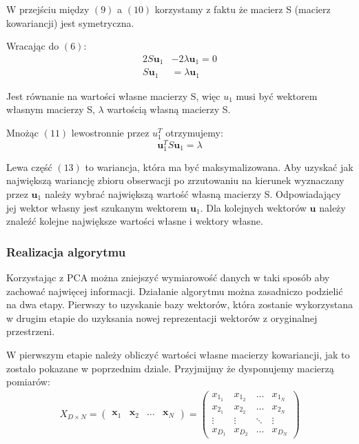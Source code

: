 \documentclass{article}
\newcommand{\bb}{\textbf}
\begin{document}
W przejściu między $(9)$ a $(10)$ korzystamy z faktu że macierz S (macierz kowariancji) jest symetryczna.

Wracając do $(6)$:
\begin{align}
	2 S \bb{u}_1 &- 2 \lambda \bb{u}_1 = 0	\nonumber \\
	S \bb{u}_1 &= \lambda \bb{u}_1 
\end{align}

Jest równanie na wartości własne macierzy S, więc $u_1$ musi być wektorem własnym macierzy S, $\lambda$ wartością własną macierzy S.

Mnożąc $(11)$ lewostronnie przez $u_1^T$ otrzymujemy:
\begin{equation}
	\bb{u}_1^T S \bb{u}_1 = \lambda
\end{equation}

Lewa część $(13)$ to wariancja, która ma być maksymalizowana. Aby uzyskać jak największą wariancję zbioru obserwacji po zrzutowaniu na kierunek wyznaczany przez $\bb{u}_1$ należy wybrać największą wartość własną macierzy S. Odpowiadający jej wektor własny jest szukanym wektorem $\bb{u}_1$. Dla kolejnych wektorów $\bb{u}$ należy znaleźć kolejne największe wartości własne i wektory własne.

\subsubsection{Realizacja algorytmu} 
Korzystając z PCA można zniejszyć wymiarowość danych w taki sposób aby zachować najwięcej informacji. Działanie algorytmu można zasadniczo podzielić na dwa etapy. Pierwszy to uzyskanie bazy wektorów, która zostanie wykorzystana w drugim etapie do uzyksania nowej reprezentacji wektorów z oryginalnej przestrzeni.

W pierwszym etapie należy obliczyć wartości własne macierzy kowariancji, jak to zostało pokazane w poprzednim dziale. Przyjmijmy że dysponujemy macierzą pomiarów:
\begin{align}
	X_{D \times N} = 
	\left( \begin{array}{llll}
		\bb{x}_1 & \bb{x}_2 & \ldots & \bb{x}_N
	\end{array} \right)	
	=
	\left( \begin{array}{llll}
		x_{1_1} & x_{1_2} & \ldots & x_{1_N} \\
		x_{2_1} & x_{2_2} & \ldots & x_{2_N} \\
		\vdots  & \vdots  & \ddots & \vdots  \\
		x_{D_1} & x_{D_2} & \ldots & x_{D_N}
	\end{array} \right)
\end{align}
\end{document}
